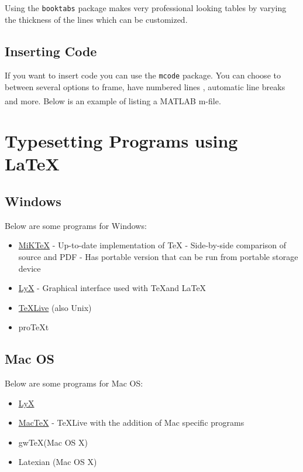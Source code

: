 \documentclass[12pt]{report}
\begin{document}
Using the \verb'booktabs' package makes very professional looking tables by varying the thickness of the lines which can be customized.

\clearpage \section{Inserting Code}
If you want to insert code you can use the \verb'mcode' package.  You can choose to between several options to frame, have numbered lines , automatic line breaks and more.  Below is an example of listing a MATLAB\textsuperscript{\textregistered} m-file.



\chapter[Programs]{Typesetting Programs using \LaTeX\ }
\section{Windows}
Below are some programs for Windows:
\begin{itemize}
\item \href{http://miktex.org/}{MiK\TeX}
\subitem- Up-to-date implementation of \TeX 
\subitem- Side-by-side comparison of source and PDF
\subitem- Has portable version that can be run from portable storage device
\item \href{http://www.lyx.org/}{LyX}
\subitem- Graphical interface used with \TeX and \LaTeX\ 
\item \href{http://www.tug.org/texlive/}{\TeX Live} (also Unix)
\item pro\TeX t
\end{itemize}

\section{Mac OS}
Below are some programs for Mac OS:
\begin{itemize}
\item \href{http://www.lyx.org/}{LyX}
\item\href{http://www.tug.org/mactex/}{Mac\TeX}
\subitem- \TeX Live with the addition of Mac specific programs
\item gw\TeX  (Mac OS X)
\item Latexian (Mac OS X)
\end{itemize}
\end{document}
